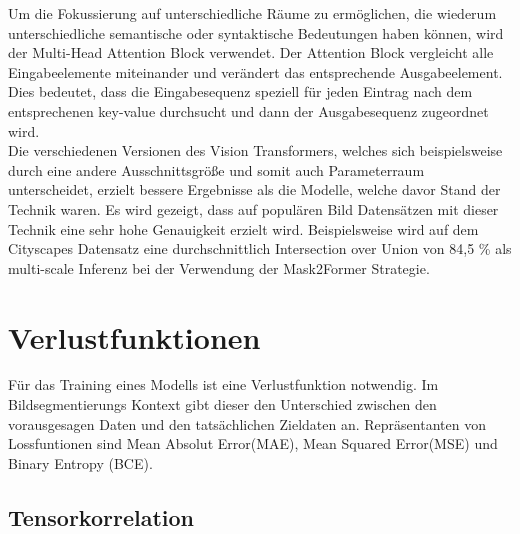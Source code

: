 Um die Fokussierung auf unterschiedliche Räume zu ermöglichen, die wiederum unterschiedliche semantische oder syntaktische Bedeutungen haben können, wird der Multi-Head Attention Block verwendet. Der Attention Block vergleicht alle Eingabeelemente miteinander und verändert das entsprechende Ausgabeelement. Dies bedeutet, dass die Eingabesequenz speziell für jeden Eintrag nach dem entsprechenen key-value durchsucht und dann der Ausgabesequenz zugeordnet wird. \\
Die verschiedenen Versionen des Vision Transformers, welches sich beispielsweise durch eine andere Ausschnittsgröße und somit auch Parameterraum unterscheidet, erzielt bessere Ergebnisse als die Modelle, welche davor Stand der Technik waren\cite{ViTdosovitskiy2021image}. Es wird gezeigt, dass auf populären Bild Datensätzen mit dieser Technik eine sehr hohe Genauigkeit erzielt wird. Beispielsweise wird auf dem Cityscapes \cite{CityscapesCordts2016} Datensatz eine durchschnittlich Intersection over Union von 84,5 \% als multi-scale Inferenz bei der Verwendung der Mask2Former \cite{Mask2Former_Cheng_2022_CVPR} Strategie.  \\




\section{Verlustfunktionen}
\label{sec:verlustfunktionen}
Für das Training eines Modells ist eine Verlustfunktion notwendig. Im Bildsegmentierungs Kontext gibt dieser den Unterschied zwischen den vorausgesagen Daten und den tatsächlichen Zieldaten an.
Repräsentanten von Lossfuntionen sind Mean Absolut Error(MAE), Mean Squared Error(MSE) und Binary  Entropy (BCE).\\

\subsection{Tensorkorrelation}


